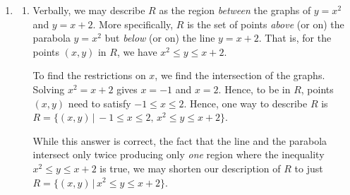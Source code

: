 \documentclass{ximera}
\begin{document}
\begin{example}
\begin{explanation}
\begin{enumerate}
\begin{enumerate}
\begin{image}
\end{image}

\end{enumerate}


\item

\begin{enumerate}

\item  Verbally, we may describe $R$ as the region \textit{between} the graphs of $y = x^2$ and $y = x+2$.  More specifically, $R$ is the set of points \textit{above} (or on) the parabola  $y=x^2$ but \textit{below} (or on) the line $y = x+2$.  That is, for the points $(x,y)$ in $R$, we have $x^2 \leq y \leq x+2$.  

To find the restrictions on $x$, we find the intersection of the graphs.  Solving $x^2 = x+2$ gives $x = -1$ and $x = 2$.  Hence, to be in $R$, points $(x,y)$ need to satisfy $-1 \leq x \leq 2$.  Hence, one way to describe $R$ is $R = \{ (x,y)  \, | \,  -1 \leq x \leq 2, \,  x^2 \leq y \leq x+2 \}$.

While this answer is correct, the fact that the line and the parabola intersect only twice producing only \textit{one} region where the inequality  $x^2 \leq y \leq x+2$ is true,  we may shorten our description of $R$ to just  $R = \{ (x,y)  \, | \,   x^2 \leq y \leq x+2 \}$.  


\end{enumerate}
\end{enumerate}
\end{explanation}
\end{example}
\end{document}
